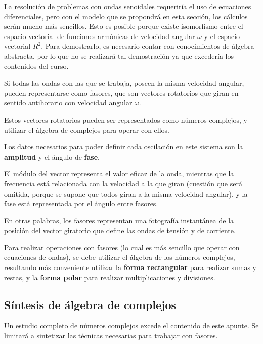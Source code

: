 La resolución de problemas con ondas senoidales requeriría el uso de ecuaciones diferenciales, pero con el modelo que se propondrá en esta sección, los cálculos serán mucho más sencillos. Esto es posible porque existe isomorfismo entre el espacio vectorial de funciones armónicas de velocidad angular $\omega$ y el espacio vectorial $R^{2}$. Para demostrarlo, es necesario contar con conocimientos de álgebra abstracta, por lo que no se realizará tal demostración ya que excedería los contenidos del curso.

Si todas las ondas con las que se trabaja, poseen la misma velocidad angular, pueden representarse como fasores, que son vectores rotatorios que giran en sentido antihorario con velocidad angular $\omega$.

Estos vectores rotatorios pueden ser representados como números complejos, y utilizar el álgebra de complejos para operar con ellos.

Los datos necesarios para poder definir cada oscilación en este sistema son la \textbf{amplitud} y el ángulo de \textbf{fase}.


El módulo del vector representa el valor eficaz de la onda, mientras que la frecuencia está relacionada con la velocidad a la que giran (cuestión que será omitida, porque se supone que todos giran a la misma velocidad angular), y la fase está representada por el ángulo entre fasores.

En otras palabras, los fasores representan una fotografía instantánea de la posición del vector giratorio que define las ondas de tensión y de corriente.

Para realizar operaciones con fasores (lo cual es más sencillo que operar con ecuaciones de ondas), se debe utilizar el álgebra de los números complejos, resultando más conveniente utilizar la \textbf{forma rectangular} para realizar sumas y restas, y la \textbf{forma polar} para realizar multiplicaciones y divisiones.

\subsection{Síntesis de álgebra de complejos}

Un estudio completo de números complejos excede el contenido de este apunte. Se limitará a sintetizar las técnicas necesarias para trabajar con fasores.

